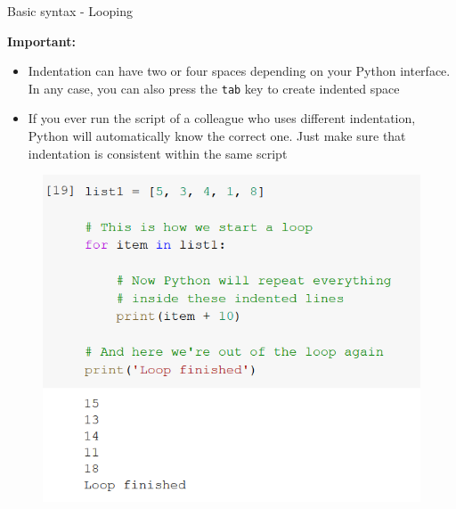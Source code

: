 \documentclass[aspectratio=169]{beamer}
\begin{document}
\begin{frame}{Basic syntax - Looping}

	\textbf{Important:}

	\begin{multicols}{2}
	
		\begin{itemize}
			\item Indentation can have two or four spaces depending on your Python interface. In any case, you can also press the \texttt{tab} key to create indented space
			\item If you ever run the script of a colleague who uses different indentation, Python will automatically know the correct one. Just make sure that indentation is consistent within the same script
		\end{itemize}
		\begin{figure}
			\centering
			\includegraphics[width=\linewidth]{img/list_loop.png}
		\end{figure}

	\end{multicols}

\end{frame}
\end{document}
